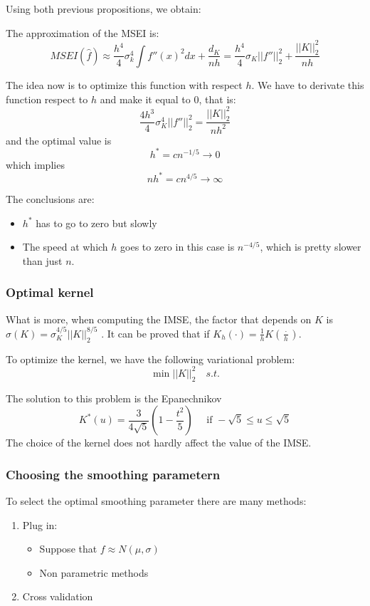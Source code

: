 Using both previous propositions, we obtain:
\begin{nprop}
The approximation of the MSEI is:
\[
MSEI(\hat f) \approx \frac{h^4}{4}\sigma_k^4 \int f''(x)^2 dx  + \frac{d_K}{nh} = \frac{h^4}{4}\sigma_K ||f''||_2^2 + \frac{||K||^2_2}{nh}
\]
\end{nprop}

The idea now is to optimize this function with respect $h$. We have to derivate this function respect to $h$ and make it equal to $0$, that is:
\[
\frac{4h^3}{4}\sigma_K^4 ||f''||_2^2 = \frac{||K||_2^2}{nh^2}
\]
and the optimal value is
\[
h^* = c n^{-1/5} \to 0
\]
which implies
\[
nh^* = cn^{4/5}\to \infty
\]

The conclusions are:
\begin{itemize}
\item $h^*$ has to go to zero but slowly
\item The speed at which $h$ goes to zero in this case is $n^{-4/5}$, which is pretty slower than just $n$.
\end{itemize}



\subsubsection{Optimal kernel}
What is more, when computing the IMSE, the factor that depends on \(K\) is \(\sigma(K) = \sigma_K^{4/5}||K||_2^{8/5}\) . It can be proved that if \(K_h(\cdot) = \frac{1}{h} K(\frac{\cdot}{h})\). 

To optimize the kernel, we have the following variational problem:
\[
\min ||K||^2_2 \quad s.t.
\]

The solution to this problem is the Epanechnikov
\[
K^*(u) = \frac{3}{4\sqrt{5}} \left( 1 - \frac{t^2}{5}\right) \quad \text{ if } -\sqrt{5} \leq u \leq \sqrt{5}
\]
The choice of the kernel does not hardly affect the value of the IMSE.


\subsubsection{Choosing the smoothing parametern}
To select the optimal smoothing parameter there are many methods:

\begin{enumerate}
\item Plug in:
  \begin{itemize}
  \item Suppose that $f \approx N(\mu,\sigma)$
    \item Non parametric methods
  \end{itemize}
  \item Cross validation
\end{enumerate}

